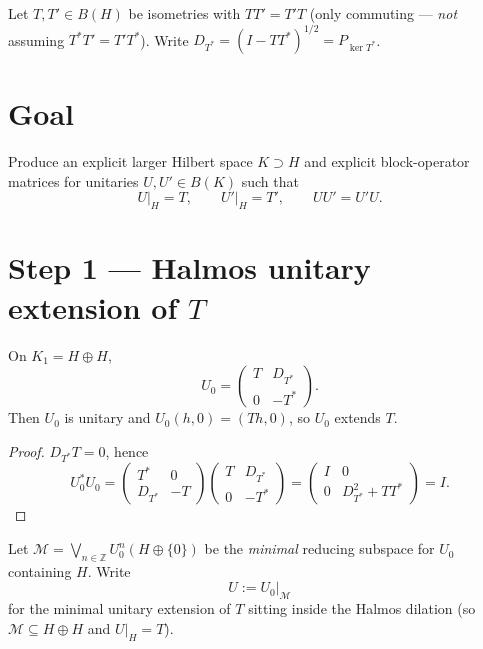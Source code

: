 \documentclass[11pt]{article}
\begin{document}
\noindent
Let \(T,T'\in B(H)\) be isometries with \(TT'=T'T\)
(only commuting --- \emph{not} assuming \(T^*T'=T'T^*\)).
Write \(D_{T^*}=(I-TT^*)^{1/2}=P_{\ker T^*}\).

\section*{Goal}
Produce an explicit larger Hilbert space \(K\supset H\) and explicit block-operator
matrices for unitaries \(U,U'\in B(K)\) such that
\[
U\big|_H=T,\qquad U'\big|_H=T',\qquad UU'=U'U.
\]

\section*{Step 1 --- Halmos unitary extension of \(T\)}

On \(K_1=H\oplus H\),
\begin{equation}
\label{eq:Halmos-T}
\boxed{
U_0
=
\begin{pmatrix}
T & D_{T^*} \\
0 & -T^*
\end{pmatrix}.
}
\end{equation}
Then \(U_0\) is unitary and \(U_0(h,0)=(Th,0)\), so \(U_0\) extends \(T\).

\begin{proof}
\(D_{T^*}T=0\), hence
\[
U_0^*U_0
=
\begin{pmatrix}
T^* & 0 \\
D_{T^*} & -T
\end{pmatrix}
\begin{pmatrix}
T & D_{T^*} \\
0 & -T^*
\end{pmatrix}
=
\begin{pmatrix}
I & 0 \\
0 & D_{T^*}^2+TT^*
\end{pmatrix}
=I.
\]
\end{proof}

\medskip
Let \(\mathcal{M}=\bigvee_{n\in\mathbb{Z}}U_0^n(H\oplus\{0\})\) be the \emph{minimal} reducing
subspace for \(U_0\) containing \(H\). Write
\[
U:=U_0\big|_{\mathcal{M}}
\]
for the minimal unitary extension of \(T\) sitting inside the Halmos dilation
(so \(\mathcal{M}\subseteq H\oplus H\) and \(U\big|_H=T\)).

\end{document}
